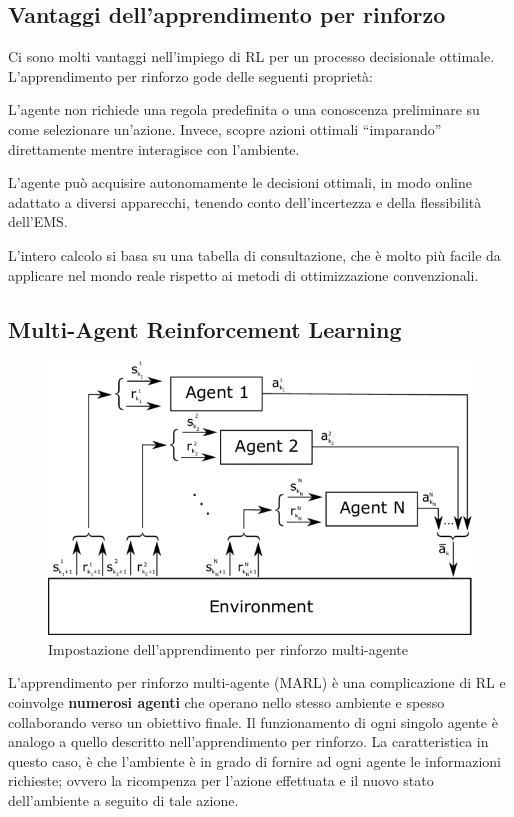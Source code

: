 \documentclass[italian, Lau, oneside]{sapthesis}
\begin{document}
\subsection{Vantaggi dell'apprendimento per rinforzo}
Ci sono molti vantaggi nell'impiego di RL per un processo decisionale ottimale. L'apprendimento per rinforzo gode delle seguenti proprietà:
\begin{description}
\addtolength{\itemindent}{0.5cm}
    \item [Privo di modelli] L'agente non richiede una regola predefinita o una conoscenza preliminare su come selezionare un'azione. Invece, scopre azioni ottimali “imparando” direttamente mentre interagisce con l'ambiente.
    \item [Adattivo] L'agente può acquisire autonomamente le decisioni ottimali, in modo online adattato a diversi apparecchi, tenendo conto dell'incertezza e della flessibilità dell'EMS.
    \item [Conciso] L'intero calcolo si basa su una tabella di consultazione, che è molto più facile da applicare nel mondo reale rispetto ai metodi di ottimizzazione convenzionali.
\end{description}


\subsection{Multi-Agent Reinforcement Learning}
\begin{figure}[h]
    \centering
    \includegraphics[width=\textwidth]{MARL.png}
    \caption{Impostazione dell’apprendimento per rinforzo multi-agente}
    \label{fig:MARL}
\end{figure}

L'apprendimento per rinforzo multi-agente (MARL) è una complicazione di RL e coinvolge \textbf{numerosi agenti} che operano nello stesso ambiente e spesso collaborando verso un obiettivo finale. Il funzionamento di ogni singolo agente è analogo a quello descritto nell'apprendimento per rinforzo. La caratteristica in questo caso, è che l'ambiente è in grado di fornire ad ogni agente le informazioni richieste; ovvero la ricompenza per l'azione effettuata e il nuovo stato dell'ambiente a seguito di tale azione. 
\end{document}

